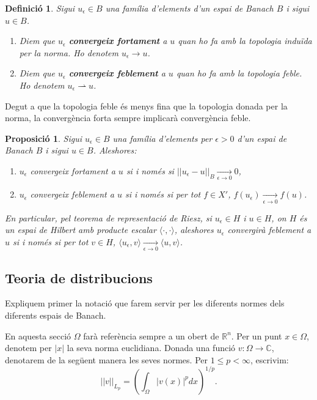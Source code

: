 \documentclass{article}
\numberwithin{equation}{section}
\newtheorem{definicio}{Definici\'{o}}[section]
\newtheorem{proposicio}{Proposici\'{o}}[section]
\begin{document}
\begin{definicio}
Sigui $u_{\epsilon}\in B$ una fam\'{i}lia d'elements d'un espai de Banach $B$ i sigui $u\in B$.
\begin{enumerate}
\item Diem que $u_{\epsilon}$ \textbf{convergeix fortament} a $u$ quan ho fa amb la topologia indu\"{i}da per la norma. Ho denotem $u_{\epsilon}\rightarrow u$.
\item Diem que $u_{\epsilon}$ \textbf{convergeix feblement} a $u$ quan ho fa amb la topologia feble. Ho denotem $u_{\epsilon}\rightharpoonup u$.
\end{enumerate}
\end{definicio}

Degut a que la topologia feble \'{e}s menys fina que la topologia donada per la norma, la converg\`{e}ncia forta sempre implicar\`{a} converg\`{e}ncia feble.

\begin{proposicio}
Sigui $u_{\epsilon}\in B$ una fam\'{i}lia d'elements per $\epsilon>0$ d'un espai de Banach $B$ i sigui $u\in B$. Aleshores:
\begin{enumerate}
\item $u_{\epsilon}$ convergeix fortament a $u$ si i nom\'{e}s si $||u_{\epsilon}-u||_B\xrightarrow[\epsilon\to0]{}0$,
\item $u_{\epsilon}$ convergeix feblement a $u$ si i nom\'{e}s si per tot $f\in X'$, $f(u_{\epsilon})\xrightarrow[\epsilon\to0]{}f(u)$.
\end{enumerate}

En particular, pel teorema de representaci\'{o} de Riesz, si $u_{\epsilon}\in H$ i $u\in H$, on $H$ \'{e}s un espai de Hilbert amb producte escalar $\langle\cdot,\cdot\rangle$, aleshores $u_{\epsilon}$ convergir\`{a} feblement a $u$ si i nom\'{e}s si per tot $v\in H$, $\langle u_{\epsilon},v\rangle\xrightarrow[\epsilon\to0]{}\langle u,v\rangle$.
\end{proposicio}

\subsection{Teoria de distribucions}

Expliquem primer la notaci\'{o} que farem servir per les diferents normes dels diferents espais de Banach.

En aquesta secci\'{o} $\Omega$ far\`{a} refer\`{e}ncia sempre a un obert de $\mathbb{R}^n$. Per un punt $x\in\Omega$, denotem per $|x|$ la seva norma euclidiana. Donada una funci\'{o} $v:\Omega\rightarrow\mathbb{C}$, denotarem de la seg\"{u}ent manera les seves normes. Per $1\leq p<\infty$, escrivim:
\begin{equation}
||v||_{L_p}=\left(\int_{\Omega}|v(x)|^pdx\right)^{1/p}.
\end{equation}
\end{document}
